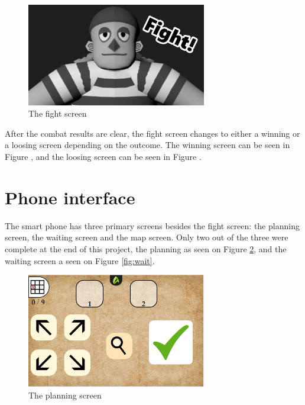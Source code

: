 \begin{figure}[h!]
	\centering
	\includegraphics[width=0.7\textwidth]{figures/fight.png}
	\caption{The fight screen}
	\label{fig:fight}
\end{figure}
After the combat results are clear, the fight screen changes to either a winning or a loosing screen depending on the outcome. The winning screen can be seen in Figure , and the loosing screen can be seen in Figure .

\section{Phone interface}
The smart phone has three primary screens besides the fight screen: the planning screen, the waiting screen and the map screen. Only two out of the three were complete at the end of this project, the planning as seen on Figure \ref{fig:plan}, and the waiting screen a seen on Figure \ref{fig:wait}. 

\begin{figure}[h!]
	\centering
	\includegraphics[width=0.7\textwidth]{figures/planningScreen.png}
	\caption{The planning screen}
	\label{fig:plan}
\end{figure}


